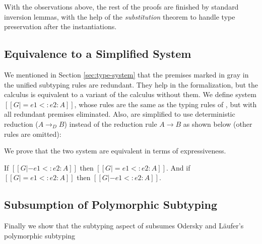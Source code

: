 With the observations above, the rest of the proofs are finished by standard
inversion lemmas, with the help of the \emph{substitution} theorem to handle type
preservation after the instantiations.

\subsection{Equivalence to a Simplified System}
We mentioned in Section \ref{sec:type-system} that the premises marked in gray in the
unified subtyping rules are redundant. They help in the formalization, but the calculus
is equivalent to a variant of the calculus without them. We define system
$[[G |= e1 <: e2 : A]]$, whose rules are the same as the typing rules of \name,
but with all redundant premises eliminated. Also, 
are simplified to use deterministic reduction ($A \longrightarrow_D B$)
instead of the reduction rule $A \longrightarrow B$ as shown below
(other rules are omitted):


We prove that the two system are equivalent in terms of expressiveness.

\begin{theorem}
  If $[[G |- e1 <: e2 : A]]$ then $[[G |= e1 <: e2 : A]]$.
  And if $[[G |= e1 <: e2 : A]]$ then $[[G |- e1 <: e2 : A]]$.
\end{theorem}

\subsection{Subsumption of Polymorphic Subtyping}

Finally we show that the subtyping aspect of \name subsumes
Odersky and L\"aufer's polymorphic
subtyping~\cite{odersky1996putting}

